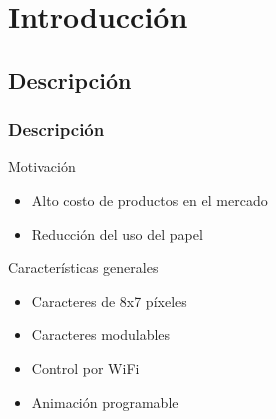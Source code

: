 \section{Introducción} 

\subsection{Descripción}
 

\newcommand\cantLetrasRenglon{3}

\begin{frame}
	\frametitle{Descripción}
	
		\begin{block}{Motivación}
			\begin{itemize}
				\item Alto costo de productos en el mercado
				\item Reducción del uso del papel
			\end{itemize}
		\end{block}

		\begin{block}{Características generales}
			\begin{itemize}
				\item Caracteres de 8x7 píxeles
				\item Caracteres modulables
				\item Control por WiFi
				\item Animación programable
			\end{itemize}
		\end{block}

\end{frame}

